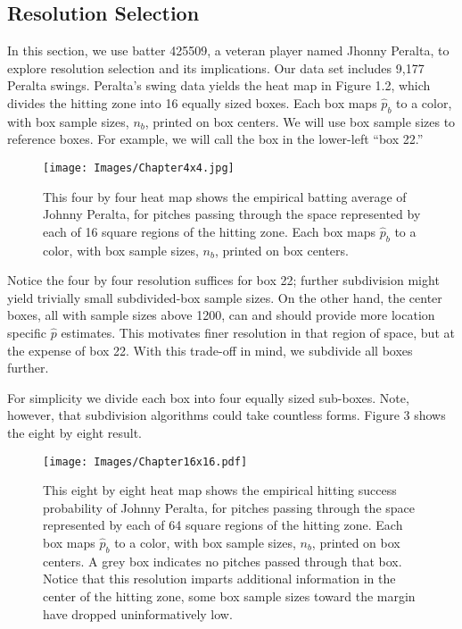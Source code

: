 \subsection{Resolution Selection}

In this section, we use batter 425509, a veteran player named Jhonny Peralta, to explore resolution selection and its implications. Our data set includes 9,177 Peralta swings. Peralta's swing data yields the heat map in Figure 1.2, which divides the hitting zone into 16 equally sized boxes. Each box maps $\hat{p}_{b}$ to a color, with box sample sizes, $n_{b}$, printed on box centers. We will use box sample sizes to reference boxes. For example, we will call the box in the lower-left ``box 22.'' 
        \begin{figure}[H]
      	\centering
      	\texttt{[image: Images/Chapter4x4.jpg]} 
      	\caption{This four by four heat map shows the empirical batting average of Johnny Peralta, for pitches passing through the space represented by each of 16 square regions of the hitting zone. Each box maps $\hat{p}_{b}$ to a color, with box sample sizes, $n_{b}$, printed on box centers.}
      	\end{figure} 

Notice the four by four resolution suffices for box 22; further subdivision might yield trivially small subdivided-box sample sizes. On the other hand, the center boxes, all with sample sizes above 1200, can and should provide more location specific $\hat{p}$ estimates. This motivates finer resolution in that region of space, but at the expense of box 22. With this trade-off in mind, we subdivide all boxes further. 

For simplicity we divide each box into four equally sized sub-boxes. Note, however, that subdivision algorithms could take countless forms. Figure 3 shows the eight by eight result.
        \begin{figure}[H]
      	\centering
      	\texttt{[image: Images/Chapter16x16.pdf]} 
      	\caption{This eight by eight heat map shows the empirical hitting success probability of Johnny Peralta, for pitches passing through the space represented by each of 64 square regions of the hitting zone. Each box maps $\hat{p}_{b}$ to a color, with box sample sizes, $n_{b}$, printed on box centers. A grey box indicates no pitches passed through that box. Notice that this resolution imparts additional information in the center of the hitting zone, some box sample sizes toward the margin have dropped uninformatively low.}
      	\end{figure} 

